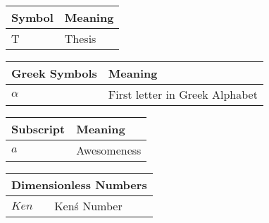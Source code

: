 \begin{center}
	\begin{table}[h]
		\centering
		\label{tab:nomenclature_symbols}
		\begin{tabular}{p{3.5cm} p{8.5cm}}
		\hline		
		\textbf{Symbol} & \textbf{Meaning}\\
		\hline		
		T & Thesis \\
		\hline
		\end{tabular}
	\end{table}	

\vspace{20mm}\vfill

	\begin{table}[h]
		\centering
		\label{tab:nomenclature_greek}
		\begin{tabular}{p{3.5cm} p{8.5cm}}
		\hline
		\textbf{Greek Symbols} & \textbf{Meaning} \\
		\hline
		$\alpha$ & First letter in Greek Alphabet \\
		\hline
		\end{tabular}		
	\end{table}

\vspace{20mm}\vfill
	
	\begin{table}[h]
		\centering
		\label{tab:nomenclature_scripts}
		\begin{tabular}{p{3.5cm} p{8.5cm}}
		\hline		
		\textbf{Subscript} & \textbf{Meaning}\\
		\hline		
		$a$ & Awesomeness\\
		\hline		
		\end{tabular}
	\end{table}	
	
\vspace{20mm}\vfill
 
	\begin{table}[h]
		\centering
		\label{tab:nomenclature_dimensionless}
		\begin{tabular}{p{3.5cm} p{8.5cm}}
		\hline
		\multicolumn{2}{l}{\textbf{Dimensionless Numbers}}\\
		\hline
		$Ken$ & Ken\'s Number \\
		\hline
		\end{tabular}
	\end{table}	

\end{center}

\vspace{20mm}\vfill